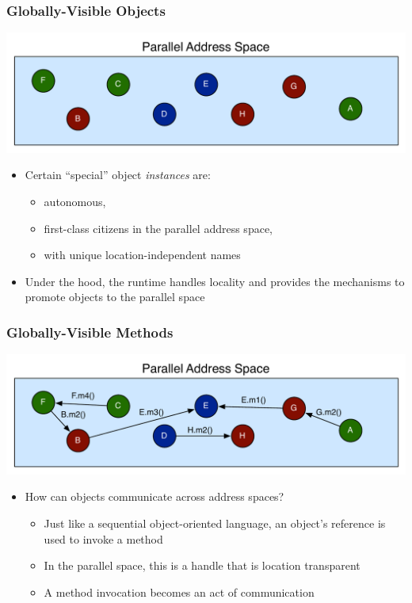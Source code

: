 \begin{frame}[fragile]
  \frametitle{Globally-Visible Objects}
  \begin{center}
    \includegraphics[width=\textwidth]{figures/objectGlobalAddress.pdf}
  \end{center}
  \begin{itemize}
    \item Certain ``special'' object \emph{instances} are:
      \begin{itemize}
      \item autonomous,
      \item first-class citizens in the parallel address space,
      \item with unique location-independent names
      \end{itemize}
    \item Under the hood, the runtime handles locality and provides the
      mechanisms to promote objects to the parallel space
  \end{itemize}
\end{frame}

\begin{frame}[fragile]
  \frametitle{Globally-Visible Methods}
  \begin{center}
    \includegraphics[width=\textwidth]{figures/objectMethodGlobalAddress.pdf}
  \end{center}
  \begin{itemize}
    \item How can objects communicate across address spaces?
      \begin{itemize}
      \item Just like a sequential object-oriented language, an object's
        reference is used to invoke a method
      \item In the parallel space, this is a handle that is location
          transparent
      \item A method invocation becomes an act of communication
      \end{itemize}
  \end{itemize}
\end{frame}

